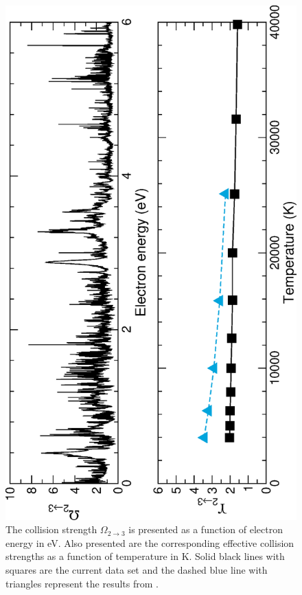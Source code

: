 %
\begin{figure}
\centering
\includegraphics[scale=0.75, angle=-90]{Figures/Cobalt/electron/trans4.eps}
\caption{The collision strength $\Omega_{2\rightarrow 3}$ is presented as a function of electron energy in eV. Also presented are the corresponding effective collision strengths as a function of temperature in K. Solid black lines with squares are the current data set and the dashed blue line with triangles represent the results from \citet{2016MNRAS.tmp..556S}. \label{fig:co_coll_infra3}}
\end{figure}
%

